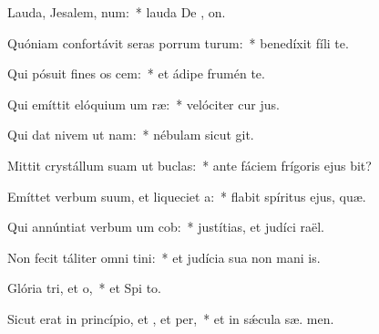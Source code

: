 \item Lauda, Jesalem, num:~* lauda De , on.
\item Quóniam confortávit seras porrum turum:~* benedíxit fíli   te.
\item Qui pósuit fines os cem:~* et ádipe frumén  te.
\item Qui emíttit elóquium um ræ:~* velóciter cur  jus.
\item Qui dat nivem ut nam:~* nébulam sicut  git.
\item Mittit crystállum suam ut buclas:~* ante fáciem frígoris ejus  bit?
\item Emíttet verbum suum, et liqueciet a:~* flabit spíritus ejus,   quæ.
\item Qui annúntiat verbum um cob:~* justítias, et judíci  raël.
\item Non fecit táliter omni tini:~* et judícia sua non mani is.
\item Glória tri, et o,~* et Spi to.
\item Sicut erat in princípio, et , et per,~* et in sǽcula sæ. men.
